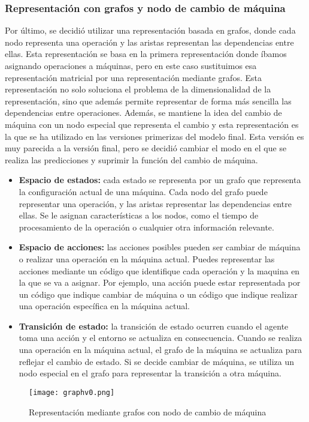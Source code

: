 \subsubsection{Representación con grafos y nodo de cambio de máquina}
Por último, se decidió utilizar una representación basada en grafos, donde cada nodo
representa una operación y las aristas representan las dependencias entre ellas. Esta
representación se basa en la primera representación donde íbamos asignando
operaciones a máquinas, pero en este caso sustituimos esa representación matricial por
una representación mediante grafos. Esta representación no solo soluciona el problema
de la dimensionalidad de la representación, sino que además permite representar de
forma más sencilla las dependencias entre operaciones. Además, se mantiene la idea del
cambio de máquina con un nodo especial que representa el cambio y esta representación
es la que se ha utilizado en las versiones primerizas del modelo final. Esta versión
es muy parecida a la versión final, pero se decidió cambiar el modo en el que se realiza
las predicciones y suprimir la función del cambio de máquina.

\begin{itemize}
    \item \textbf{Espacio de estados:} cada estado se representa por un grafo 
    que representa la configuración actual de una máquina. Cada nodo del grafo puede representar 
    una operación, y las aristas representar las dependencias entre ellas. Se le asignan
    características a los nodos, como el tiempo de procesamiento de la operación o cualquier 
    otra información relevante.
    \item \textbf{Espacio de acciones:} las acciones posibles pueden ser cambiar de máquina 
    o realizar una operación en la máquina actual. Puedes representar las acciones mediante 
    un código que identifique cada operación y la maquina en la que se va a asignar. Por 
    ejemplo, una acción puede estar representada por un código que indique cambiar de máquina o 
    un código que indique realizar una operación específica en la máquina actual.
    \item \textbf{Transición de estado:} la transición de estado ocurren cuando el agente 
    toma una acción y el entorno se actualiza en consecuencia. Cuando se realiza una operación 
    en la máquina actual, el grafo de la máquina se actualiza para reflejar el cambio de estado. 
    Si se decide cambiar de máquina, se utiliza un nodo especial en el grafo para representar 
    la transición a otra máquina.
\end{itemize}
\begin{figure}[ht]
    \centering
    \texttt{[image: graphv0.png]}
    \caption{Representación mediante grafos con nodo de cambio de máquina}
    \label{fig:rep-graph-v0}
\end{figure}
